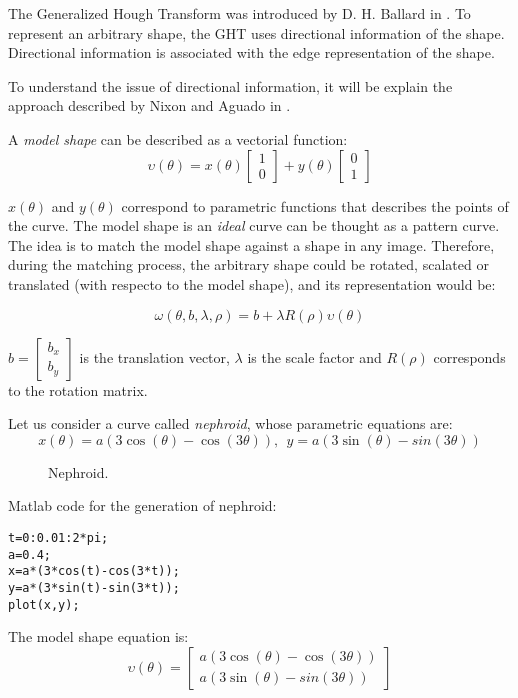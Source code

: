 \documentclass{ws-procs9x6}
\begin{document}
The Generalized Hough Transform was introduced by D. H. Ballard in
\cite{ballard}.
To represent an arbitrary shape, the GHT uses directional information
of the shape. 
Directional information is associated with the edge representation of
the shape. 

To understand the issue of directional information, it will be explain
the approach described by Nixon and Aguado in \cite{nixon}.

A \emph{model shape} can be described as a vectorial function:
$$ \upsilon(\theta) = x(\theta)\begin{bmatrix} 1 \\ 0\end{bmatrix} + y(\theta)\begin{bmatrix} 0\\ 1\end{bmatrix}$$ 

$x(\theta)$ and $y(\theta)$ correspond to parametric functions that
    describes the points of the curve. The model shape is an
    \emph{ideal} curve can be thought as a pattern curve. The
    idea is to match the model shape against a shape in any image.
Therefore, during the matching process, the arbitrary shape could be
rotated, scalated or translated (with respecto to the model shape),
and its representation would be:

$$ \omega(\theta,b,\lambda,\rho)= b + \lambda R(\rho)\upsilon(\theta)$$

 $b=\begin{bmatrix}b_{x} \\ b_{y}\end{bmatrix}$ is the translation
vector, $\lambda$ is the scale factor and $R(\rho)$ corresponds to the
rotation matrix.

Let us consider a curve called \emph{nephroid}, whose parametric equations are:
$$x(\theta)=a(3\cos(\theta) - \cos(3\theta)), \ \ y=a(3\sin(\theta) - sin(3\theta))$$

\begin{figure}
\centering
{}
\caption{Nephroid.}
\end{figure}

Matlab code for the generation of nephroid:
\begin{verbatim}
t=0:0.01:2*pi;
a=0.4;
x=a*(3*cos(t)-cos(3*t));
y=a*(3*sin(t)-sin(3*t));
plot(x,y);
\end{verbatim}

The model shape equation is:
$$ \upsilon(\theta) =  \begin{bmatrix} a(3\cos(\theta) - \cos(3\theta)) \\ a(3\sin(\theta) - sin(3\theta))\end{bmatrix}$$ 
\end{document}
